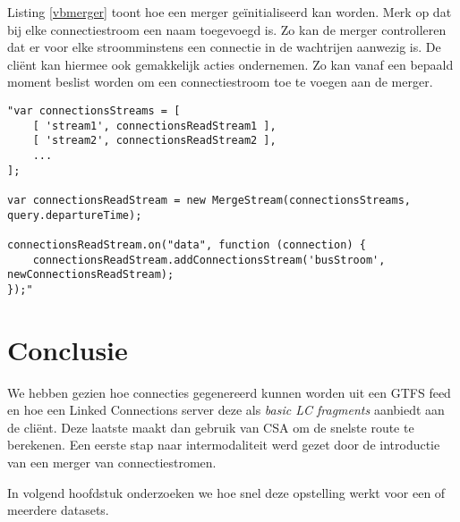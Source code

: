 Listing \ref{vbmerger} toont hoe een merger ge\"initialiseerd kan worden. Merk op dat bij elke connectiestroom een naam toegevoegd is. Zo kan de merger controlleren dat er voor elke stroomminstens een connectie in de wachtrijen aanwezig is. De cli\"ent kan hiermee ook gemakkelijk acties ondernemen. Zo kan vanaf een bepaald moment beslist worden om een connectiestroom toe te voegen aan de merger.

\begin{lstlisting}[label=vbmerger,caption=Voorbeeldcode van een merger. Deze voegt meerdere stromen van connecties samen.]
"var connectionsStreams = [
    [ 'stream1', connectionsReadStream1 ],
    [ 'stream2', connectionsReadStream2 ],
    ...
];

var connectionsReadStream = new MergeStream(connectionsStreams, query.departureTime);

connectionsReadStream.on("data", function (connection) {
    connectionsReadStream.addConnectionsStream('busStroom', newConnectionsReadStream);
});"
\end{lstlisting}

\section{Conclusie}

We hebben gezien hoe connecties gegenereerd kunnen worden uit een GTFS feed en hoe een Linked Connections server deze als \textit{basic LC fragments} aanbiedt aan de cli\"ent. Deze laatste maakt dan gebruik van CSA om de snelste route te berekenen. Een eerste stap naar intermodaliteit werd gezet door de introductie van een merger van connectiestromen.

In volgend hoofdstuk onderzoeken we hoe snel deze opstelling werkt voor een of meerdere datasets.

%
